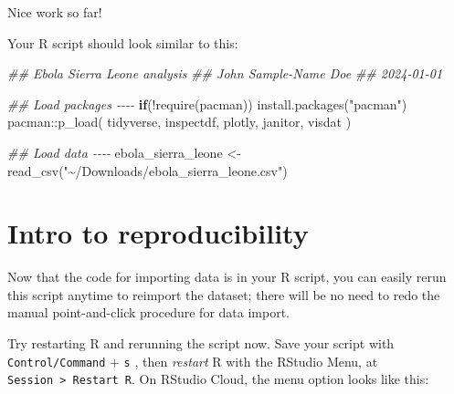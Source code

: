 \documentclass[
  letterpaper,
  DIV=11,
  numbers=noendperiod]{scrreprt}
\newenvironment{Shaded}{\begin{snugshade}}{\end{snugshade}}
\newcommand{\ControlFlowTok}[1]{\textcolor[rgb]{0.00,0.23,0.31}{\textbf{#1}}}
\newcommand{\DocumentationTok}[1]{\textcolor[rgb]{0.37,0.37,0.37}{\textit{#1}}}
\newcommand{\FunctionTok}[1]{\textcolor[rgb]{0.28,0.35,0.67}{#1}}
\newcommand{\NormalTok}[1]{\textcolor[rgb]{0.00,0.23,0.31}{#1}}
\newcommand{\OtherTok}[1]{\textcolor[rgb]{0.00,0.23,0.31}{#1}}
\newcommand{\SpecialCharTok}[1]{\textcolor[rgb]{0.37,0.37,0.37}{#1}}
\newcommand{\StringTok}[1]{\textcolor[rgb]{0.13,0.47,0.30}{#1}}
\begin{document}
\begin{tcolorbox}[enhanced jigsaw, titlerule=0mm, colback=white, left=2mm, breakable, opacitybacktitle=0.6, colbacktitle=quarto-callout-note-color!10!white, colframe=quarto-callout-note-color-frame, bottomtitle=1mm, opacityback=0, coltitle=black, arc=.35mm, toptitle=1mm, title=\textcolor{quarto-callout-note-color}{\faInfo}\hspace{0.5em}{Recap}, leftrule=.75mm, toprule=.15mm, bottomrule=.15mm, rightrule=.15mm]

Nice work so far!

Your R script should look similar to this:

\begin{Shaded}
\begin{Highlighting}[]
\DocumentationTok{\#\# Ebola Sierra Leone analysis}
\DocumentationTok{\#\# John Sample{-}Name Doe}
\DocumentationTok{\#\# 2024{-}01{-}01}

\DocumentationTok{\#\# Load packages {-}{-}{-}{-}}
\ControlFlowTok{if}\NormalTok{(}\SpecialCharTok{!}\FunctionTok{require}\NormalTok{(pacman)) }\FunctionTok{install.packages}\NormalTok{(}\StringTok{"pacman"}\NormalTok{)}
\NormalTok{pacman}\SpecialCharTok{::}\FunctionTok{p\_load}\NormalTok{(}
\NormalTok{  tidyverse,}
\NormalTok{  inspectdf,}
\NormalTok{  plotly,}
\NormalTok{  janitor,}
\NormalTok{  visdat}
\NormalTok{)}

\DocumentationTok{\#\# Load data {-}{-}{-}{-}}
\NormalTok{ebola\_sierra\_leone }\OtherTok{\textless{}{-}} \FunctionTok{read\_csv}\NormalTok{(}\StringTok{"\textasciitilde{}/Downloads/ebola\_sierra\_leone.csv"}\NormalTok{)}
\end{Highlighting}
\end{Shaded}

\end{tcolorbox}

\section{Intro to reproducibility}\label{intro-to-reproducibility}

Now that the code for importing data is in your R script, you can easily
rerun this script anytime to reimport the dataset; there will be no need
to redo the manual point-and-click procedure for data import.

Try restarting R and rerunning the script now. Save your script with
\texttt{Control/Command} + \texttt{s} , then \emph{restart} R with the
RStudio Menu, at \texttt{Session\ \textgreater{}\ Restart\ R}. On
RStudio Cloud, the menu option looks like this:
\end{document}
